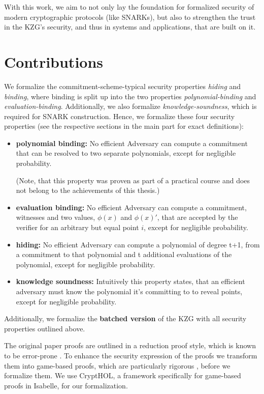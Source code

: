 With this work, we aim to not only lay the foundation for formalized security of modern cryptographic protocols (like SNARKs), but also to strengthen the trust in the KZG's security, and thus in systems and applications, that are built on it. 

\section{Contributions}

We formalize the commitment-scheme-typical security properties \textit{hiding} and \textit{binding}, where binding is split up into the two properties \textit{polynomial-binding} and \textit{evaluation-binding}. Additionally, we also formalize \textit{knowledge-soundness}, which is required for SNARK construction. Hence, we formalize these four security properties (see the respective sections in the main part for exact definitions):
\begin{itemize}
    \item \textbf{polynomial binding:}
    No efficient Adversary can compute a commitment that can be resolved to two separate polynomials, except for negligible probability.

    (Note, that this property was proven as part of a practical course and does not belong to the achievements of this thesis.)
    \item \textbf{evaluation binding:}
    No efficient Adversary can compute a commitment, witnesses and two values, $\phi(x)$ and $\phi(x)'$, that are accepted by the verifier for an arbitrary but equal point $i$, except for negligible probability.
    \item \textbf{hiding:}
    No efficient Adversary can compute a polynomial of degree t+1, from a commitment to that polynomial and t additional evaluations of the polynomial, except for negligible probability.
    \item \textbf{knowledge soundness:}
    Intuitively this property states, that an efficient adversary must know the polynomial it's committing to to reveal points, except for negligible probability. 
\end{itemize} 
Additionally, we formalize the \textbf{batched version} of the KZG with all security properties outlined above.  

The original paper proofs are outlined in a reduction proof style, which is known to be error-prone \parencite{gamesB&R}. To enhance the security expression of the proofs we transform them into game-based proofs, which are particularly rigorous \parencite{shoup_games, gamesB&R}, before we formalize them. We use CryptHOL, a framework specifically for game-based proofs in Isabelle, for our formalization. 


